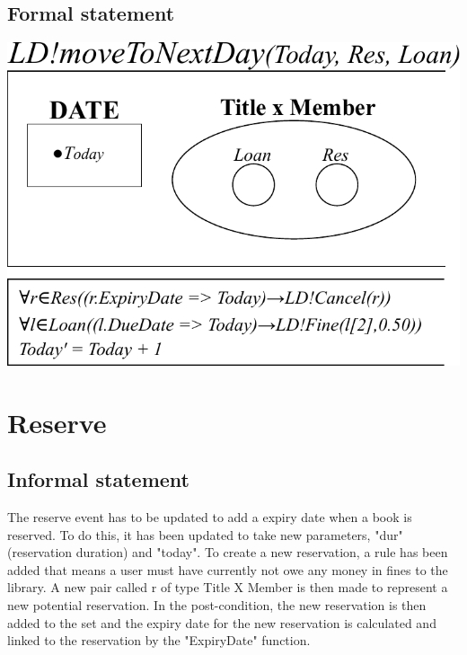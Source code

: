 \documentclass[]{report}
\begin{document}
\subsection{Formal statement}
\begin{center}
	\includegraphics{move_to_next_day.pdf}
\end{center}
\newpage
\section{Reserve}
\subsection{Informal statement}
The reserve event has to be updated to add a expiry date when a book is reserved. To do this, it has been updated to take new parameters, "dur" (reservation duration) and "today". To create a new reservation, a rule has been added that means a user must have currently not owe any money in fines to the library. A new pair called r of type Title X Member is then made to represent a new potential reservation. In the post-condition, the new reservation is then added to the set and the expiry date for the new reservation is calculated and linked to the reservation by the "ExpiryDate" function. 
\end{document}

